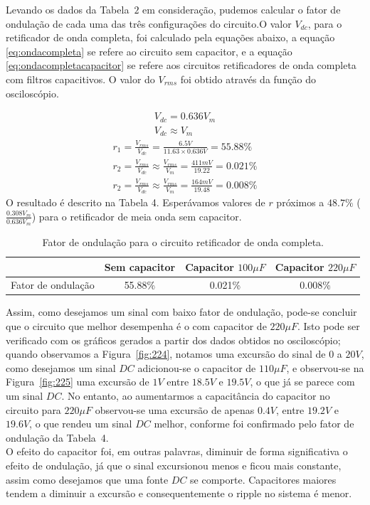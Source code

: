 \documentclass[12pt,a4paper]{article}
\begin{document}
        Levando os dados da Tabela~$2$ em consideração, pudemos calcular o fator de ondulação de cada uma das três configurações do circuito.O valor $V_{dc}$, para o retificador de onda completa, foi calculado pela equações abaixo, a equação \ref{eq:ondacompleta} se refere ao circuito sem capacitor, e a equação \ref{eq:ondacompletacapacitor} se refere aos circuitos retificadores de onda completa com filtros capacitivos. O valor do $V_{rms}$ foi obtido através da função do osciloscópio.

 \begin{align}
   \label{eq:ondacompleta}
   V_{dc}  =0.636 V_m  \\
   \label{eq:ondacompletacapacitor}
   V_{dc} \approx V_m 
 \end{align}
\begin{align}
  r_1 = \frac{V_{rms}}{V_{dc}}= \frac{6.5 V}{11.63 \times 0.636 V}= 55.88\%\\
  r_2= \frac{V_{rms}}{V_{dc}} \approx \frac{V_{rms}}{V_{m}} = \frac{411 mV}{19.22}= 0.021 \% \\
  r_2= \frac{V_{rms}}{V_{dc}} \approx \frac{V_{rms}}{V_{m}} = \frac{164 mV}{19.48}= 0.008 \%
\end{align}
O resultado é descrito na Tabela 4. Esperávamos valores de $r$ próximos a $48.7\%$ ($\frac{0.308 V_{m}}{0.636 V_{m}}$) para o retificador de meia onda sem capacitor.
    \begin{table}[htpb]
        \centering
        \caption{Fator de ondulação para o circuito retificador de onda completa.}
        \begin{tabular}{l c c c}
        \toprule
        & Sem capacitor & Capacitor $100 \mu F$ & Capacitor $220 \mu F$ \\ \midrule
        \multicolumn{1}{c}{Fator de ondulação} & 55.88\%       &  0.021\%  &  0.008\%                \\ \bottomrule
        \end{tabular}
        \end{table}

        Assim, como desejamos um sinal com baixo fator de ondulação, pode-se concluir que o circuito que melhor desempenha é o com capacitor de $220 \mu F$. Isto pode ser verificado com os gráficos gerados a partir dos dados obtidos no osciloscópio; quando observamos a Figura~\ref{fig:224}, notamos uma excursão do sinal de $0$ a $20V$, como desejamos um sinal $DC$ adicionou-se o capacitor de $110 \mu F$, e observou-se na Figura~\ref{fig:225} uma excursão de $1V$ entre $18.5 V$ e $19.5 V$, o que já se parece com um sinal $DC$. No entanto, ao aumentarmos a capacitância do capacitor no circuito para $220 \mu F$ observou-se uma excursão de apenas $0.4 V$, entre $19.2 V$ e $19.6V$, o que rendeu um sinal $DC$ melhor, conforme foi confirmado pelo fator de ondulação da Tabela~4. \\
        O efeito do capacitor foi, em outras palavras, diminuir de forma significativa o efeito de ondulação, já que o sinal excursionou menos e ficou mais constante, assim como desejamos que uma fonte $DC$ se comporte. Capacitores maiores tendem a diminuir a excursão e consequentemente o ripple no sistema é menor.
\end{document}
